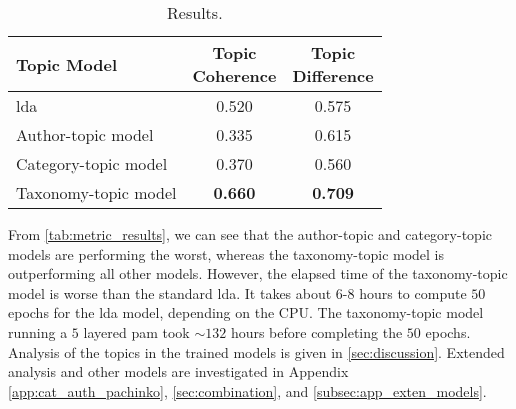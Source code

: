 \begin{table}[h]
	\centering
	\caption{Results.}
	\begin{tabular}{l|c|c}
		Topic Model & \makecell{Topic \\ Coherence} & \makecell{Topic \\ Difference} \\
		\midrule
		\Acrlong{lda} & 0.520 & 0.575 \\
		Author-topic model & 0.335 & 0.615 \\
		Category-topic model & 0.370 & 0.560 \\
		Taxonomy-topic model & \textbf{0.660} & \textbf{0.709} \\
	\end{tabular}
	\label{tab:metric_results}
\end{table}

From \autoref{tab:metric_results}, we can see that the author-topic and category-topic models are performing the worst, whereas the taxonomy-topic model is outperforming all other models.
However, the elapsed time of the taxonomy-topic model is worse than the standard \gls{lda}.
It takes about $6$-$8$ hours to compute $50$ epochs for the \gls{lda} model, depending on the CPU. 
The taxonomy-topic model running a $5$ layered \gls{pam} took ${\sim}132$ hours before completing the $50$ epochs.
Analysis of the topics in the trained models is given in \autoref{sec:discussion}.
Extended analysis and other models are investigated in Appendix \autoref{app:cat_auth_pachinko}, \autoref{sec:combination}, and \autoref{subsec:app_exten_models}.
